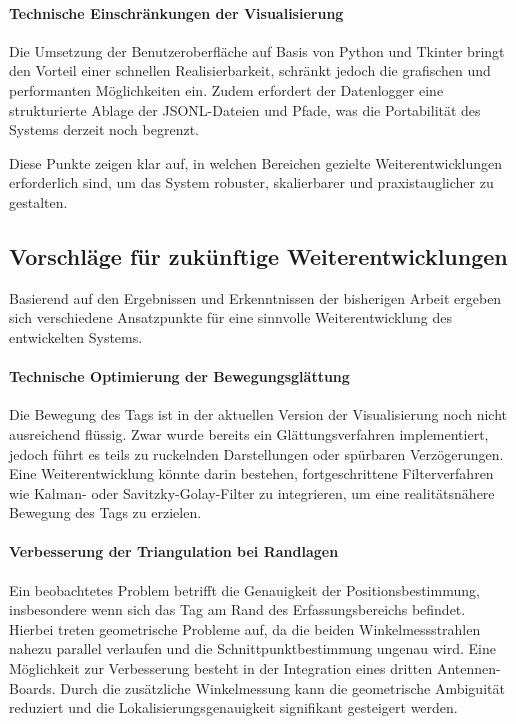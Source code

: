 \documentclass[a4paper, 12pt]{article} %
\begin{document}
\paragraph{Technische Einschränkungen der Visualisierung}
Die Umsetzung der Benutzeroberfläche auf Basis von Python und Tkinter bringt den Vorteil einer schnellen Realisierbarkeit, schränkt jedoch die 
grafischen und performanten Möglichkeiten ein. Zudem erfordert der Datenlogger eine strukturierte Ablage der \ac{JSONL}-Dateien und Pfade, was die 
Portabilität des Systems derzeit noch begrenzt.

Diese Punkte zeigen klar auf, in welchen Bereichen gezielte Weiterentwicklungen erforderlich sind, um das System robuster, skalierbarer und 
praxistauglicher zu gestalten.

\subsection{Vorschläge für zukünftige Weiterentwicklungen}

Basierend auf den Ergebnissen und Erkenntnissen der bisherigen Arbeit ergeben sich verschiedene Ansatzpunkte für eine sinnvolle Weiterentwicklung
 des entwickelten Systems.

\paragraph{Technische Optimierung der Bewegungsglättung}
Die Bewegung des Tags ist in der aktuellen Version der Visualisierung noch nicht ausreichend flüssig. Zwar wurde bereits ein Glättungsverfahren 
implementiert, jedoch führt es teils zu ruckelnden Darstellungen oder spürbaren Verzögerungen. Eine Weiterentwicklung könnte darin bestehen, 
fortgeschrittene Filterverfahren wie Kalman- oder Savitzky-Golay-Filter zu integrieren, um eine realitätsnähere Bewegung des Tags zu erzielen.

\paragraph{Verbesserung der Triangulation bei Randlagen}
Ein beobachtetes Problem betrifft die Genauigkeit der Positionsbestimmung, insbesondere wenn sich das Tag am Rand des Erfassungsbereichs befindet. 
Hierbei treten geometrische Probleme auf, da die beiden Winkelmessstrahlen nahezu parallel verlaufen und die Schnittpunktbestimmung ungenau wird. 
Eine Möglichkeit zur Verbesserung besteht in der Integration eines dritten Antennen-Boards. Durch die zusätzliche Winkelmessung kann die geometrische 
Ambiguität reduziert und die Lokalisierungsgenauigkeit signifikant gesteigert werden.
\end{document}
